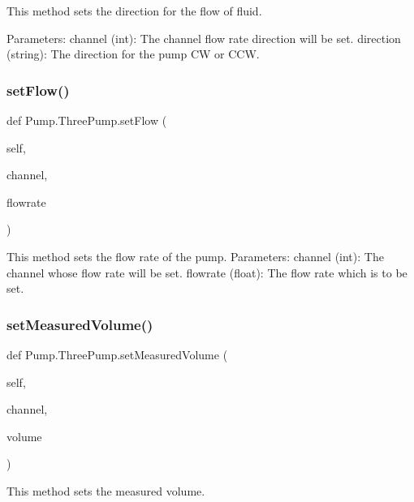 \begin{DoxyVerb}This method sets the direction for the flow of fluid.

Parameters:
    channel (int): The channel flow rate direction will be set.
    direction (string): The direction for the pump CW or CCW.
\end{DoxyVerb}
 \mbox{\label{class_pump_1_1_three_pump_af318067f4573840cdcf5ed34be7c06ee}} 
\subsubsection{\texorpdfstring{setFlow()}{setFlow()}}
{\footnotesize\ttfamily def Pump.\+Three\+Pump.\+set\+Flow (\begin{DoxyParamCaption}\item[{}]{self,  }\item[{}]{channel,  }\item[{}]{flowrate }\end{DoxyParamCaption})}

\begin{DoxyVerb}This method sets the flow rate of the pump.
Parameters:
    channel (int): The channel whose flow rate will be set.
    flowrate (float): The flow rate which is to be set.
\end{DoxyVerb}
 \mbox{\label{class_pump_1_1_three_pump_ab8d0c7431108de453afbc7d61210a521}} 
\subsubsection{\texorpdfstring{setMeasuredVolume()}{setMeasuredVolume()}}
{\footnotesize\ttfamily def Pump.\+Three\+Pump.\+set\+Measured\+Volume (\begin{DoxyParamCaption}\item[{}]{self,  }\item[{}]{channel,  }\item[{}]{volume }\end{DoxyParamCaption})}

\begin{DoxyVerb}This method sets the measured volume.
\end{DoxyVerb}
 \mbox{\label{class_pump_1_1_three_pump_a4dd2281d58ae1b975676270045a6fe04}} 
